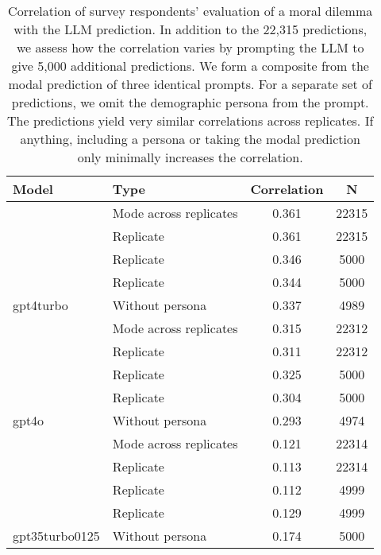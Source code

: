 \begin{table}[!h]
\centering
\caption{\label{tab:corr-tab}Correlation of survey respondents' evaluation of a moral dilemma with the LLM prediction. In addition to the 22,315 predictions, we assess how the correlation varies by prompting the LLM to give 5,000 additional predictions. We form a composite from the modal prediction of three identical prompts. For a separate set of predictions, we omit the demographic persona from the prompt. The predictions yield very similar correlations across replicates. If anything, including a persona or taking the modal prediction only minimally increases the correlation.}
\centering
\begin{tabular}[t]{llcc}
\toprule
Model & Type & Correlation & N\\
\midrule
 & Mode across replicates & 0.361 & 22315\\
\cmidrule{2-4}
 & Replicate & 0.361 & 22315\\
\cmidrule{2-4}
 & Replicate & 0.346 & 5000\\
\cmidrule{2-4}
 & Replicate & 0.344 & 5000\\
\cmidrule{2-4}
\multirow{-5}{*}{\raggedright\arraybackslash gpt4turbo} & Without persona & 0.337 & 4989\\
\cmidrule{1-4}
 & Mode across replicates & 0.315 & 22312\\
\cmidrule{2-4}
 & Replicate & 0.311 & 22312\\
\cmidrule{2-4}
 & Replicate & 0.325 & 5000\\
\cmidrule{2-4}
 & Replicate & 0.304 & 5000\\
\cmidrule{2-4}
\multirow{-5}{*}{\raggedright\arraybackslash gpt4o} & Without persona & 0.293 & 4974\\
\cmidrule{1-4}
 & Mode across replicates & 0.121 & 22314\\
\cmidrule{2-4}
 & Replicate & 0.113 & 22314\\
\cmidrule{2-4}
 & Replicate & 0.112 & 4999\\
\cmidrule{2-4}
 & Replicate & 0.129 & 4999\\
\cmidrule{2-4}
\multirow{-5}{*}{\raggedright\arraybackslash gpt35turbo0125} & Without persona & 0.174 & 5000\\
\bottomrule
\end{tabular}
\end{table}
